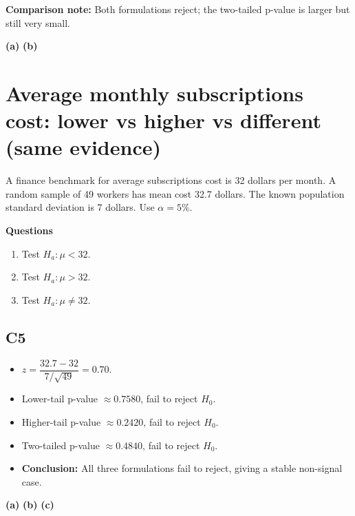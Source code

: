 \textbf{Comparison note:} Both formulations reject; the two-tailed p-value is larger but still very small.

\begin{center}
\textbf{(a)}\;
\hspace{0.8cm}
\textbf{(b)}\;
\end{center}


\section{Average monthly subscriptions cost: lower vs higher vs different (same evidence)}
A finance benchmark for average subscriptions cost is 32 dollars per month. A random sample of 49 workers has mean cost 32.7 dollars. The known population standard deviation is 7 dollars. Use \(\alpha=5\%\).

\textbf{Questions}
\begin{enumerate}
    \item[(a)] Test \(H_a\colon \mu<32\).
    \item[(b)] Test \(H_a\colon \mu>32\).
    \item[(c)] Test \(H_a\colon \mu\ne32\).
\end{enumerate}

\subsection*{C5}
\begin{itemize}
    \item \(z=\dfrac{32.7-32}{7/\sqrt{49}}=0.70\).
    \item Lower-tail p-value \(\approx0.7580\), fail to reject \(H_0\).
    \item Higher-tail p-value \(\approx0.2420\), fail to reject \(H_0\).
    \item Two-tailed p-value \(\approx0.4840\), fail to reject \(H_0\).
    \item \textbf{Conclusion:} All three formulations fail to reject, giving a stable non-signal case.
\end{itemize}

\begin{center}
\textbf{(a)}\;
\hspace{0.5cm}
\textbf{(b)}\;
\hspace{0.5cm}
\textbf{(c)}\;
\end{center}


